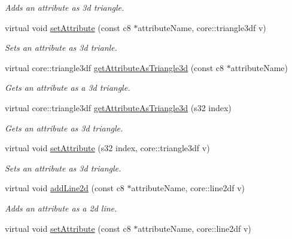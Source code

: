 \begin{DoxyCompactItemize}
\begin{DoxyCompactList}\small\item\em Adds an attribute as 3d triangle. \end{DoxyCompactList}\item 
virtual void \hyperlink{classirr_1_1io_1_1_c_attributes_a46d3d00ecd0513f1ee1e79adfd5fce97}{set\-Attribute} (const c8 $\ast$attribute\-Name, core\-::triangle3df v)
\begin{DoxyCompactList}\small\item\em Sets an attribute as 3d trianle. \end{DoxyCompactList}\item 
virtual core\-::triangle3df \hyperlink{classirr_1_1io_1_1_c_attributes_a457147a7a40c27094e7dcb4308144abf}{get\-Attribute\-As\-Triangle3d} (const c8 $\ast$attribute\-Name)
\begin{DoxyCompactList}\small\item\em Gets an attribute as a 3d triangle. \end{DoxyCompactList}\item 
virtual core\-::triangle3df \hyperlink{classirr_1_1io_1_1_c_attributes_ada7a9f066e52fe61c836b8f2d8705e23}{get\-Attribute\-As\-Triangle3d} (s32 index)
\begin{DoxyCompactList}\small\item\em Gets an attribute as 3d triangle. \end{DoxyCompactList}\item 
\hypertarget{classirr_1_1io_1_1_c_attributes_a99aa03ed6bd2292ed14eaf4f0d3a1db3}{virtual void \hyperlink{classirr_1_1io_1_1_c_attributes_a99aa03ed6bd2292ed14eaf4f0d3a1db3}{set\-Attribute} (s32 index, core\-::triangle3df v)}\label{classirr_1_1io_1_1_c_attributes_a99aa03ed6bd2292ed14eaf4f0d3a1db3}

\begin{DoxyCompactList}\small\item\em Sets an attribute as 3d triangle. \end{DoxyCompactList}\item 
\hypertarget{classirr_1_1io_1_1_c_attributes_a23f1985c5578c936f2116c7060a2f931}{virtual void \hyperlink{classirr_1_1io_1_1_c_attributes_a23f1985c5578c936f2116c7060a2f931}{add\-Line2d} (const c8 $\ast$attribute\-Name, core\-::line2df v)}\label{classirr_1_1io_1_1_c_attributes_a23f1985c5578c936f2116c7060a2f931}

\begin{DoxyCompactList}\small\item\em Adds an attribute as a 2d line. \end{DoxyCompactList}\item 
\hypertarget{classirr_1_1io_1_1_c_attributes_aeb04f7f55a6a6beba2abcd3872f2ed7b}{virtual void \hyperlink{classirr_1_1io_1_1_c_attributes_aeb04f7f55a6a6beba2abcd3872f2ed7b}{set\-Attribute} (const c8 $\ast$attribute\-Name, core\-::line2df v)}\label{classirr_1_1io_1_1_c_attributes_aeb04f7f55a6a6beba2abcd3872f2ed7b}


\end{DoxyCompactItemize}
